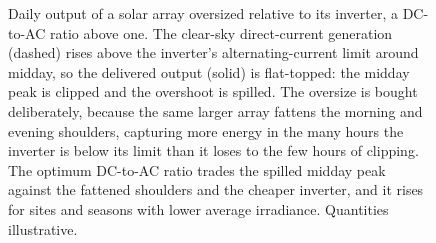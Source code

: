 \begin{figure}[htbp]
\centering
{}
\caption[Inverter clipping of an oversized array]{Daily output of a solar
array oversized relative to its inverter, a DC-to-AC ratio above one. The
clear-sky direct-current generation (dashed) rises above the inverter's
alternating-current limit around midday, so the delivered output (solid) is
flat-topped: the midday peak is clipped and the overshoot is spilled. The
oversize is bought deliberately, because the same larger array fattens the
morning and evening shoulders, capturing more energy in the many hours the
inverter is below its limit than it loses to the few hours of clipping. The
optimum DC-to-AC ratio trades the spilled midday peak against the fattened
shoulders and the cheaper inverter, and it rises for sites and seasons with
lower average irradiance. Quantities illustrative.}
\label{fig:vol04ch14:inverter-clipping}
\end{figure}
